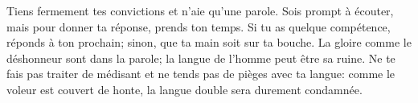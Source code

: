 Tiens fermement tes convictions et n’aie qu’une parole.
Sois prompt à écouter, mais pour donner ta réponse, prends ton temps.
Si tu as quelque compétence, réponds à ton prochain;
	sinon, que ta main soit sur ta bouche.
La gloire comme le déshonneur sont dans la parole;
	la langue de l’homme peut être sa ruine.
Ne te fais pas traiter de médisant et ne tends pas de pièges avec ta langue:
	comme le voleur est couvert de honte, la langue double sera durement condamnée.
